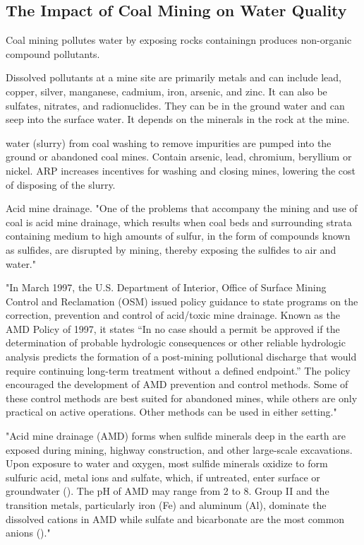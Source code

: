 \documentclass{article}
\begin{document}
\subsection{The Impact of Coal Mining on Water Quality}

Coal mining pollutes water by exposing rocks containingn produces non-organic compound pollutants. 

Dissolved pollutants at a mine site are primarily metals and can include lead, copper, silver, manganese, cadmium, iron, arsenic, and zinc. It can also be sulfates, nitrates, and radionuclides. They can be in the ground water and can seep into the surface water. It depends on the minerals in the rock at the mine. \cite{ceto2000abandoned}

\cite{duhigg2009clean} water (slurry) from coal washing to remove impurities are pumped into the ground or abandoned coal mines. Contain arsenic, lead, chromium, beryllium or nickel. ARP increases incentives for washing and closing mines, lowering the cost of disposing of the slurry.

Acid mine drainage.
"One of the problems that accompany the mining and use of coal is acid mine drainage, which results when coal beds and surrounding strata containing medium to high amounts of sulfur, in the form of compounds known as sulfides, are disrupted by mining, thereby exposing the sulfides to air and water."\cite{schweinfurth2009introduction}

"In March 1997, the U.S. Department of Interior, Office of Surface
Mining Control and Reclamation (OSM) issued policy guidance to state
programs on the correction, prevention and control of acid/toxic mine
drainage. Known as the AMD Policy of 1997, it states “In no case should
a permit be approved if the determination of probable hydrologic
consequences or other reliable hydrologic analysis predicts the formation
of a post-mining pollutional discharge that would require continuing
long-term treatment without a defined endpoint.” The policy
encouraged the development of AMD prevention and control methods.
Some of these control methods are best suited for abandoned mines,
while others are only practical on active operations. Other methods can
be used in either setting."\cite{skousen2019acid}

"Acid mine drainage (AMD) forms when sulfide minerals deep in the
earth are exposed during mining, highway construction, and other
large-scale excavations. Upon exposure to water and oxygen, most
sulfide minerals oxidize to form sulfuric acid, metal ions and sulfate,
which, if untreated, enter surface or groundwater (\cite{akcil2006acid}). The pH of AMD may range from 2 to 8. Group II and the transition
metals, particularly iron (Fe) and aluminum (Al), dominate the
dissolved cations in AMD while sulfate and bicarbonate are the most
common anions (\cite{skousen1998handbook})."\cite{skousen2019acid}
\end{document}
